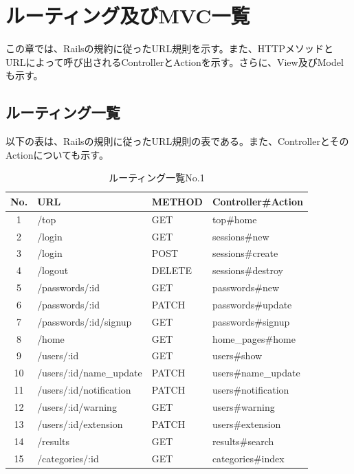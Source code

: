 \documentclass[a4j]{jarticle}
\begin{document}
\section{ルーティング及びMVC一覧}
この章では、Railsの規約に従ったURL規則を示す。また、HTTPメソッドとURLによって呼び出されるControllerとActionを示す。さらに、View及びModelも示す。
\newpage
\subsection{ルーティング一覧}
以下の表は、Railsの規則に従ったURL規則の表である。また、ControllerとそのActionについても示す。



\begin{table}[htb]
  \caption{ルーティング一覧No.1}
  \centering
  \begin{tabular}{|c|l|l||l|} \hline
   No. & URL & METHOD & Controller\#Action \\ \hline \hline

   1 & /top & GET & top\#home \\ \hline

	 2 & /login & GET & sessions\#new \\
   3 & /login & POST & sessions\#create \\
	 4 & /logout & DELETE & sessions\#destroy \\ \hline

	 5 &	/passwords/:id & GET & passwords\#new \\
	 6 & /passwords/:id	& PATCH	& passwords\#update \\
   7 & /passwords/:id/signup & GET & passwords\#signup \\ \hline

	 8 &	/home	& GET & home\_pages\#home \\ \hline

	 9 &	/users/:id & GET & users\#show \\
	 10 &	/users/:id/name\_update & PATCH & users\#name\_update \\
   11 & /users/:id/notification & PATCH & users\#notification \\
   12 & /users/:id/warning & GET & users\#warning \\
   13 & /users/:id/extension & PATCH & users\#extension \\ \hline

	14 &	/results & GET & results\#search \\ \hline

	15 &	/categories/:id & GET & categories\#index \\ \hline


\end{tabular}
\end{table}
\end{document}
